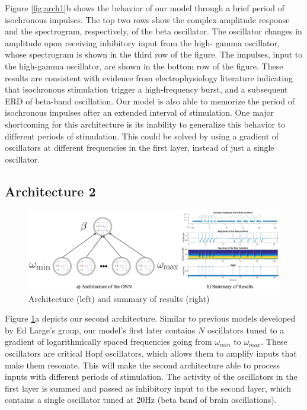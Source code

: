 \documentclass{article}
\begin{document}
Figure \ref{fig:arch1}b shows the behavior of our model through a brief period of isochronous impulses. The top two rows show the complex amplitude response and the spectrogram, respectively, of the beta oscillator. The oscillator changes in amplitude upon receiving inhibitory input from the high- gamma oscillator, whose spectrogram is shown in the third row of the figure. The impulses, input to the high-gamma oscillator, are shown in the bottom row of the figure. These results are consistent with evidence from electrophysiology literature indicating that isochronous stimulation trigger a high-frequency burst, and a subsequent ERD of beta-band oscillation. Our model is also able to memorize the period of isochronous impulses after an extended interval of stimulation. One major shortcoming for this architecture is its inability to generalize this behavior to different periods of stimulation. This could be solved by using a gradient of oscillators at different frequencies in the first layer, instead of just a single oscillator.

\subsection{Architecture 2}

\begin{figure}[b]
  \centering
  \includegraphics[scale=0.33]{arch2.png}
  \caption{Architecture (left) and summary of results (right)}
  \label{fig:arch2}
\end{figure}

Figure \ref{fig:arch2}a depicts our second architecture. Similar to previous models developed by Ed Large's group, our model's first later contains $N$ oscillators tuned to a gradient of logarithmically spaced frequencies going from $\omega_{min}$ to $\omega_{max}$. These oscillators are critical Hopf oscillators, which allows them to amplify inputs that make them resonate. This will make the second architecture able to process inputs with different periods of stimulation. The activity of the oscillators in the first layer is summed and passed as inhibitory input to the second layer, which contains a single oscillator tuned at 20Hz (beta band of brain oscillations).
\end{document}
